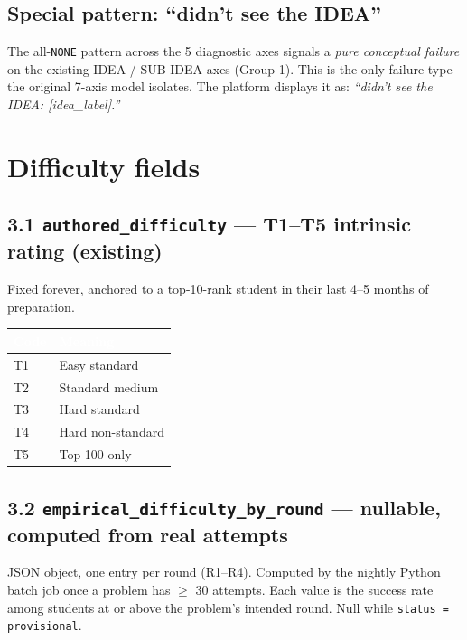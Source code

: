 \documentclass[11pt,letterpaper]{article}
\newcommand{\cd}[1]{\texttt{\small #1}}
\begin{document}
\subsection*{Special pattern: ``didn't see the IDEA''}

The all-\cd{NONE} pattern across the 5 diagnostic axes signals a \emph{pure conceptual failure} on the existing IDEA / SUB-IDEA axes (Group 1). This is the only failure type the original 7-axis model isolates. The platform displays it as: \emph{``didn't see the IDEA: [idea\_label].''}

\newpage
\section{Difficulty fields}\label{sec:diff}

\subsection*{3.1 \cd{authored\_difficulty} --- T1--T5 intrinsic rating (existing)}

Fixed forever, anchored to a top-10-rank student in their last 4--5 months of preparation.

\begin{tabular}{|p{1.5cm}|p{14.0cm}|}
\hline
\rowcolor{headergray}\textcolor{white}{\textbf{Code}} & \textcolor{white}{\textbf{Meaning}} \\
\hline
T1 & Easy standard \\
\rowcolor{altrow}T2 & Standard medium \\
T3 & Hard standard \\
\rowcolor{altrow}T4 & Hard non-standard \\
T5 & Top-100 only \\
\hline
\end{tabular}

\subsection*{3.2 \cd{empirical\_difficulty\_by\_round} --- nullable, computed from real attempts}

JSON object, one entry per round (R1--R4). Computed by the nightly Python batch job once a problem has $\geq$ 30 attempts. Each value is the success rate among students at or above the problem's intended round. Null while \cd{status = provisional}.

\end{document}
